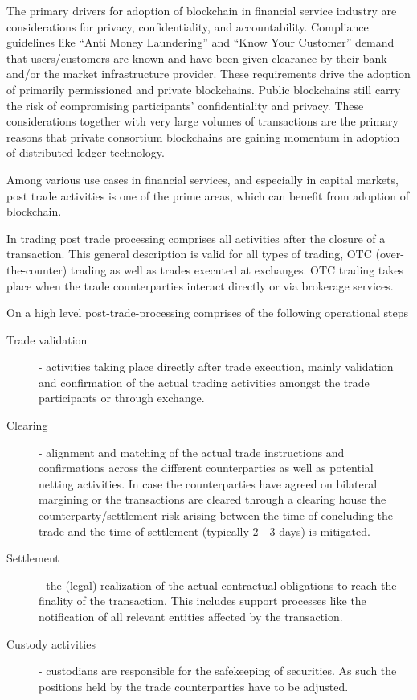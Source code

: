 The primary drivers for adoption of blockchain in financial service industry are considerations for privacy, confidentiality, and accountability. Compliance guidelines like “Anti Money Laundering” and “Know Your Customer” demand that users/customers are known and have been given clearance by their bank and/or the market infrastructure provider. These requirements drive the adoption of primarily permissioned and private blockchains. Public blockchains still carry the risk of compromising participants' confidentiality and privacy. These considerations together with very large volumes of transactions are the primary reasons that private consortium blockchains are gaining momentum in adoption of distributed ledger technology.

Among various use cases in financial services, and especially in capital markets, post trade activities is one of the prime areas, which can benefit from adoption of blockchain.

In trading post trade processing comprises all activities after the closure of a transaction. This general description is valid for all types of trading, OTC (over-the-counter) trading as well as trades executed at exchanges. OTC trading takes place when the trade counterparties interact directly or via brokerage services.

On a high level post-trade-processing comprises of the following operational steps
\begin{description}
\item [Trade validation] - activities taking place directly after trade execution, mainly validation and confirmation of the actual trading activities amongst the trade participants or through exchange. 
\item [Clearing] - alignment and  matching of the actual trade instructions and confirmations across the different counterparties as well as potential netting activities. In case the counterparties have agreed on bilateral margining or the transactions are cleared through a clearing house the counterparty/settlement risk arising between the time of concluding the trade and the time of settlement (typically 2 - 3 days) is mitigated. 
\item [Settlement] - the (legal) realization of the actual contractual obligations to reach the finality of the transaction. This includes support processes like the notification of all relevant entities affected by the transaction.
\item [Custody activities] - custodians are responsible for the safekeeping of securities. As such the positions held by the trade counterparties have to be adjusted. 
\end{description}

